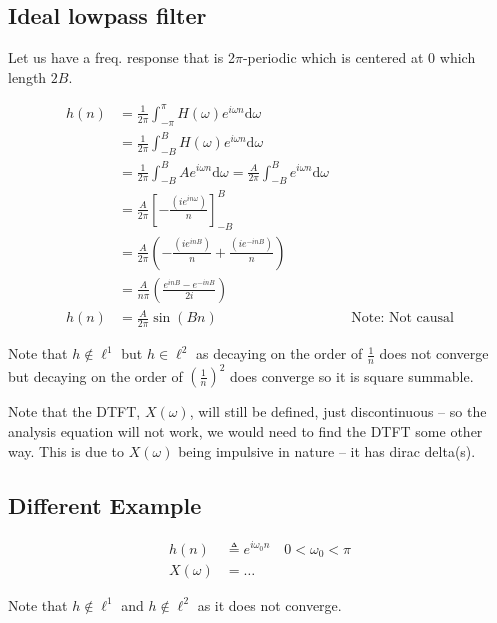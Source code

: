 \subsection{Ideal lowpass filter}
Let us have a freq. response that is 2$\pi$-periodic which is centered at 0 which length $2B$.

\begin{align*}
    h(n)
    &=
    \frac1{2\pi} \int_{-\pi}^\pi H(\omega) e^{i\omega n} \mathrm d\omega
    \\
    &=
    \frac1{2\pi} \int_{-B}^B H(\omega) e^{i\omega n} \mathrm d\omega
    \\
    &=
    \frac1{2\pi} \int_{-B}^B A e^{i\omega n} \mathrm d\omega
    = \frac A{2\pi} \int_{-B}^B e^{i\omega n} \mathrm d\omega
    \\
    &=
    \frac A{2\pi}
    \left[-\frac{(i e^{i n \omega})}n\right]
    _{-B}^B
    \\&=
    \frac A{2\pi}
    \left(-\frac{(i e^{i n B})}n + \frac{(i e^{-i n B})}n\right)
    \\&=
    \frac A{n\pi}
    \left(\frac{e^{i n B} - e^{-i n B}}{2i}\right)
    \\
    h(n)
    &=
    \frac A{2\pi} \sin(Bn)
    &&\text{Note: Not causal}
\end{align*}

Note that $h\not\in\ell^1$ but $h\in\ell^2$ as decaying on the order of $\frac1n$ does not converge but decaying on the order of $\left(\frac1n\right)^2$ does converge so it is square summable.

Note that the DTFT, $X(\omega)$, will still be defined, just discontinuous -- so the analysis equation will not work, we would need to find the DTFT some other way. This is due to $X(\omega)$ being impulsive in nature -- it has dirac delta(s).

\subsection{Different Example}
\begin{align*}
    h(n)
    &\triangleq
    e^{i\omega_0n}\quad 0<\omega_0<\pi
    \\
    X(\omega)
    &= \dots
\end{align*}

Note that $h\not\in\ell^1$ and $h\not\in\ell^2$ as it does not converge.

\hrulefill
